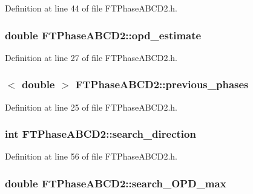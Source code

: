 Definition at line 44 of file FTPhaseABCD2.h.

\hypertarget{classFTPhaseABCD2_af1f0c943e60909356c5f9cc509c2612e}{
\subsubsection[{opd\_\-estimate}]{\setlength{\rightskip}{0pt plus 5cm}double {\bf FTPhaseABCD2::opd\_\-estimate}}}
\label{classFTPhaseABCD2_af1f0c943e60909356c5f9cc509c2612e}


Definition at line 27 of file FTPhaseABCD2.h.

\hypertarget{classFTPhaseABCD2_af6cf30f4e9241a2d546d76687be8520c}{
\subsubsection[{previous\_\-phases}]{$<$ double $>$ {\bf FTPhaseABCD2::previous\_\-phases}}}
\label{classFTPhaseABCD2_af6cf30f4e9241a2d546d76687be8520c}


Definition at line 25 of file FTPhaseABCD2.h.

\hypertarget{classFTPhaseABCD2_a773a081c902d4d60218c667ae8dfb3fe}{
\subsubsection[{search\_\-direction}]{\setlength{\rightskip}{0pt plus 5cm}int {\bf FTPhaseABCD2::search\_\-direction}}}
\label{classFTPhaseABCD2_a773a081c902d4d60218c667ae8dfb3fe}


Definition at line 56 of file FTPhaseABCD2.h.

\hypertarget{classFTPhaseABCD2_a484c9e4e012a3fc922e7af510f0567db}{
\subsubsection[{search\_\-OPD\_\-max}]{\setlength{\rightskip}{0pt plus 5cm}double {\bf FTPhaseABCD2::search\_\-OPD\_\-max}}}
\label{classFTPhaseABCD2_a484c9e4e012a3fc922e7af510f0567db}


